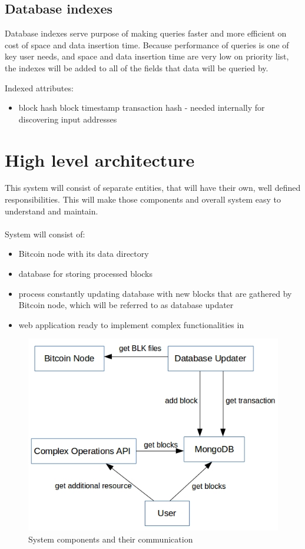 \documentclass[12pt, en, eng, oneside]{mgr}
\begin{document}
 

\subsection{Database indexes}

Database indexes serve purpose of making queries faster and more efficient on cost of space and data insertion time.
Because performance of queries is one of key user needs, and space and data insertion time are very low on priority list, the indexes will be added to all of the fields that data will be queried by.

Indexed attributes:
\begin{itemize}
\item
block hash
block timestamp
transaction hash - needed internally for discovering input addresses
\end{itemize} 


\section{High level architecture}
This system will consist of separate entities, that will have their own, well defined responsibilities. This will make those components and overall system easy to understand and maintain.
\\
\\
System will consist of:
\begin{itemize}
\item
Bitcoin node with its data directory
\item
database for storing processed blocks
\item
process constantly updating database with new blocks that are gathered by Bitcoin node, which will be referred to as database updater
\item
web application ready to implement complex functionalities in
\end{itemize}

\begin{figure}[H]
  \includegraphics[width=0.8\linewidth]{component-diagram.png}
  \caption{System components and their communication}
  \label{fig:system-components-and-their-communication}
\end{figure}
\end{document}
